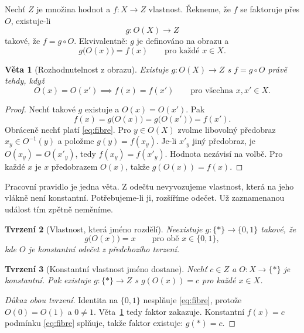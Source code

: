 \documentclass[11pt,a4paper]{article}
\newtheorem{theorem}{Věta}
\newtheorem{proposition}[theorem]{Tvrzení}
\theoremstyle{definition}
\theoremstyle{remark}
\begin{document}
Nechť \(Z\) je množina hodnot a \(f\colon X\to Z\) vlastnost.
Řekneme, že \(f\) se faktoruje přes \(O\), existuje-li
\[
  g\colon O(X)\to Z
\]
takové, že \(f=g\circ O\).
Ekvivalentně: \(g\) je definováno na obrazu a
\[
  g\bigl(O(x)\bigr)=f(x)\qquad\text{pro každé }x\in X.
\]

\begin{theorem}[Rozhodnutelnost z obrazu]
\label{thm:factors}
Existuje \(g\colon O(X)\to Z\) s \(f=g\circ O\) právě tehdy, když
\begin{equation}
\label{eq:fibre}
  O(x)=O(x')\implies f(x)=f(x')
  \qquad\text{pro všechna }x,x'\in X.
\end{equation}
\end{theorem}

\begin{proof}
Nechť takové \(g\) existuje a \(O(x)=O(x')\).
Pak
\[
  f(x)=g\bigl(O(x)\bigr)=g\bigl(O(x')\bigr)=f(x').
\]
Obráceně nechť platí \eqref{eq:fibre}.
Pro \(y\in O(X)\) zvolme libovolný předobraz \(x_y\in O^{-1}(y)\) a položme
\(g(y)=f(x_y)\).
Je-li \(x'_y\) jiný předobraz, je \(O(x_y)=O(x'_y)\), tedy \(f(x_y)=f(x'_y)\).
Hodnota nezávisí na volbě. Pro každé \(x\) je \(x\) předobrazem \(O(x)\), takže
\(g(O(x))=f(x)\).
\end{proof}

Pracovní pravidlo je jedna věta.
Z odečtu nevyvozujeme vlastnost, která na jeho vlákně není konstantní.
Potřebujeme-li ji, rozšíříme odečet.
Už zaznamenanou událost tím zpětně neměníme.

\begin{proposition}[Vlastnost, která jméno rozdělí]
\label{prop:split}
Neexistuje \(g\colon\{\ast\}\to\{0,1\}\) takové, že
\[
  g\bigl(O(x)\bigr)=x\qquad\text{pro obě }x\in\{0,1\},
\]
kde \(O\) je konstantní odečet z předchozího tvrzení.
\end{proposition}

\begin{proposition}[Konstantní vlastnost jméno dostane]
\label{prop:const}
Nechť \(c\in Z\) a \(O\colon X\to\{\ast\}\) je konstantní.
Pak existuje \(g\colon\{\ast\}\to Z\) s \(g(O(x))=c\) pro každé \(x\in X\).
\end{proposition}

\begin{proof}[Důkaz obou tvrzení]
Identita na \(\{0,1\}\) nesplňuje \eqref{eq:fibre}, protože \(O(0)=O(1)\) a \(0\neq 1\).
Věta~\ref{thm:factors} tedy faktor zakazuje.
Konstantní \(f(x)=c\) podmínku \eqref{eq:fibre} splňuje, takže faktor existuje:
\(g(\ast)=c\).
\end{proof}
\end{document}
